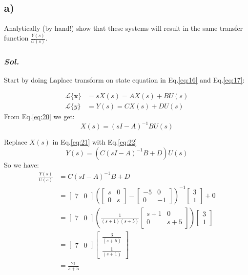 \subsection{a)}
Analytically (by hand!) show that these systems will result in the same transfer
function $\frac{Y(s)}{U(s)}$.
\subsubsection{\textit{ Sol. }}

Start by doing Laplace transform on state equation in Eq.\ref{eq:16} and Eq.\ref{eq:17}:

\begin{align}
    \mathcal{L} \{\dot{\textbf{x}}\} &= sX(s) = AX(s) + BU(s) \label{eq:20}\\ 
    \mathcal{L} \{y\} &= Y(s) = CX(s) + DU(s) \label{eq:21}
\end{align}
From Eq.\ref{eq:20} we get:
\begin{equation}
    X(s) = (sI - A)^{-1}BU(s) \label{eq:22}
\end{equation}

Replace $X(s)$ in Eq.\ref{eq:21} with Eq.\ref{eq:22}
\begin{equation}
    Y(s) = (C(sI - A)^{-1}B + D)U(s) \label{eq:23}
\end{equation}
So we have: 
\begin{equation}
    \begin{aligned}
        \frac{Y(s)}{U(s)} &= C(sI - A)^{-1}B + D \\
        &= \begin{bmatrix} 7 & 0 \end{bmatrix}
        (\begin{bmatrix} s & 0 \\ 0 & s \end{bmatrix} -
        \begin{bmatrix} -5 & 0 \\ 0 & -1 \end{bmatrix})^{-1}
        \begin{bmatrix} 3\\1\end{bmatrix} + 0 \\ 
        &= \begin{bmatrix} 7 & 0 \end{bmatrix}\left(\frac{1}{(s+1)(s+5)}\begin{bmatrix}
            s+1 & 0 \\
            0   & s+5
        \end{bmatrix}\right)\begin{bmatrix} 3\\1\end{bmatrix}\\ 
        &= \begin{bmatrix} 7 & 0 \end{bmatrix}\begin{bmatrix} \frac{3}{(s+5)} \\ \frac{1}{(s+1)} \end{bmatrix}\\ 
        &=\frac{21}{s+5}
    \end{aligned}
\end{equation}

